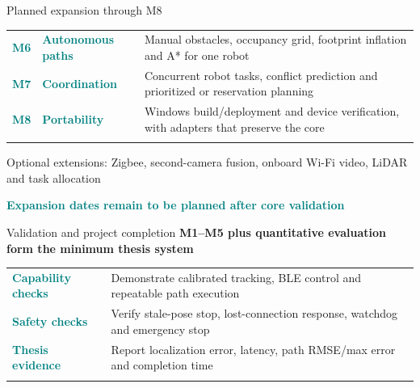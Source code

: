 \documentclass[11pt,aspectratio=169]{beamer}
\newcommand{\planrow}[2]{\textcolor{Teal}{\textbf{#1}} & #2 \\\noalign{\vskip 12pt}}
\newcommand{\milestonerow}[3]{\textcolor{Teal}{\textbf{#1}} & \textcolor{Teal}{\textbf{#2}} & #3 \\\noalign{\vskip 12pt}}
\begin{document}
\begin{frame}{Planned expansion through M8}
\small
\begin{tabular}{@{}P{0.65cm}P{2.85cm}P{10.0cm}@{}}
\milestonerow{M6}{Autonomous paths}{Manual obstacles, occupancy grid, footprint inflation and A* for one robot}
\milestonerow{M7}{Coordination}{Concurrent robot tasks, conflict prediction and prioritized or reservation planning}
\milestonerow{M8}{Portability}{Windows build/deployment and device verification, with adapters that preserve the core}
\end{tabular}

\textcolor{Muted}{Optional extensions: Zigbee, second-camera fusion, onboard Wi-Fi video, LiDAR and task allocation}
\vspace{2mm}

\textcolor{Teal}{\textbf{Expansion dates remain to be planned after core validation}}
\end{frame}

\begin{frame}{Validation and project completion}
\textbf{M1--M5 plus quantitative evaluation form the minimum thesis system}
\vspace{4mm}

\small
\begin{tabular}{@{}P{3.1cm}P{10.7cm}@{}}
\planrow{Capability checks}{Demonstrate calibrated tracking, BLE control and repeatable path execution}
\planrow{Safety checks}{Verify stale-pose stop, lost-connection response, watchdog and emergency stop}
\planrow{Thesis evidence}{Report localization error, latency, path RMSE/max error and completion time}
\end{tabular}
\end{frame}
\end{document}
